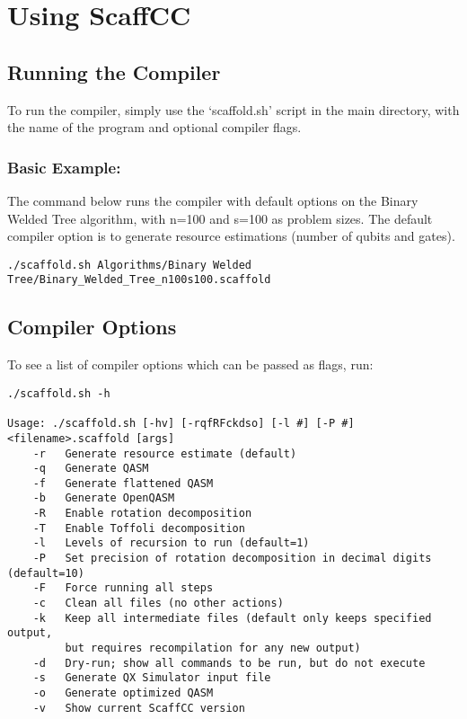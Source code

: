 \chapter{Using ScaffCC}\label{ch:usage}

\section{Running the Compiler}
To run the compiler, simply use the `scaffold.sh' script in the main directory, with the name of the program and optional compiler flags.

\subsection{Basic Example:}

The command below runs the compiler with default options on the Binary Welded Tree algorithm, with n=100 and s=100 as problem sizes.
The default compiler option is to generate resource estimations (number of qubits and gates).

\begin{lstlisting}
./scaffold.sh Algorithms/Binary Welded Tree/Binary_Welded_Tree_n100s100.scaffold
\end{lstlisting}


\section{Compiler Options}
To see a list of compiler options which can be passed as flags, run:

\begin{lstlisting}
./scaffold.sh -h

Usage: ./scaffold.sh [-hv] [-rqfRFckdso] [-l #] [-P #] <filename>.scaffold [args]
    -r   Generate resource estimate (default)
    -q   Generate QASM
    -f   Generate flattened QASM
    -b   Generate OpenQASM
    -R   Enable rotation decomposition
    -T   Enable Toffoli decomposition
    -l   Levels of recursion to run (default=1)
    -P   Set precision of rotation decomposition in decimal digits (default=10)
    -F   Force running all steps
    -c   Clean all files (no other actions)
    -k   Keep all intermediate files (default only keeps specified output,
         but requires recompilation for any new output)
    -d   Dry-run; show all commands to be run, but do not execute
    -s   Generate QX Simulator input file 
    -o   Generate optimized QASM
    -v   Show current ScaffCC version
\end{lstlisting}

